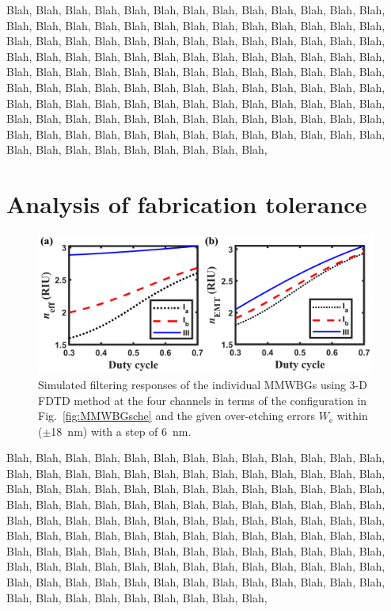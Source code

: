 \documentclass[lettersize,journal]{IEEEtran}
\def\rur#1{{\color{rured}#1}}
\begin{document}
    Blah, Blah, Blah, Blah, Blah, Blah, Blah, Blah, Blah, Blah, Blah, Blah, Blah, Blah, Blah, Blah, Blah, Blah, 
    Blah, Blah, Blah, Blah, Blah, Blah, Blah, Blah, Blah, Blah, Blah, Blah, Blah, Blah, Blah, Blah, Blah, Blah, 
    Blah, Blah, Blah, Blah, Blah, Blah, Blah, Blah, Blah, Blah, Blah, Blah, Blah, Blah, Blah, Blah, Blah, Blah, 
    Blah, Blah, Blah, Blah, Blah, Blah, Blah, Blah, Blah, Blah, Blah, Blah, Blah, Blah, Blah, Blah, Blah, Blah, 
    Blah, Blah, Blah, Blah, Blah, Blah, Blah, Blah, Blah, Blah, Blah, Blah, Blah, Blah, Blah, Blah, Blah, Blah, 
    Blah, Blah, Blah, Blah, Blah, Blah, Blah, Blah, Blah, Blah, Blah, Blah, Blah, Blah, Blah, Blah, Blah, Blah, 
    Blah, Blah, Blah, Blah, Blah, Blah, Blah, Blah, Blah, Blah, Blah, Blah, Blah, Blah, Blah, Blah, Blah, Blah, 

\section{Analysis of fabrication tolerance}
\label{sec:three}
    \begin{figure}[!t]
		\includegraphics{Fig_sample.pdf}
		\centering
		\caption{\label{fig:MMWBGtole}Simulated filtering responses \rur{of the individual MMWBGs} 
                    using 3-D FDTD method at \rur{the} four channels 
                    in terms of \rur{the configuration in Fig.~\ref{fig:MMWBGsche}} and 
                    the \rur{given} over-etching errors $W_\text{e}$ \rur{within ($\pm$18~nm)} with a step of 6~nm.}
	\end{figure}
    Blah, Blah, Blah, Blah, Blah, Blah, Blah, Blah, Blah, Blah, Blah, Blah, Blah, Blah, Blah, Blah, Blah, Blah, 
    Blah, Blah, Blah, Blah, Blah, Blah, Blah, Blah, Blah, Blah, Blah, Blah, Blah, Blah, Blah, Blah, Blah, Blah, 
    Blah, Blah, Blah, Blah, Blah, Blah, Blah, Blah, Blah, Blah, Blah, Blah, Blah, Blah, Blah, Blah, Blah, Blah, 
    Blah, Blah, Blah, Blah, Blah, Blah, Blah, Blah, Blah, Blah, Blah, Blah, Blah, Blah, Blah, Blah, Blah, Blah, 
    Blah, Blah, Blah, Blah, Blah, Blah, Blah, Blah, Blah, Blah, Blah, Blah, Blah, Blah, Blah, Blah, Blah, Blah, 
    Blah, Blah, Blah, Blah, Blah, Blah, Blah, Blah, Blah, Blah, Blah, Blah, Blah, Blah, Blah, Blah, Blah, Blah, 
    Blah, Blah, Blah, Blah, Blah, Blah, Blah, Blah, Blah, Blah, Blah, Blah, Blah, Blah, Blah, Blah, Blah, Blah, 
 
\end{document}

